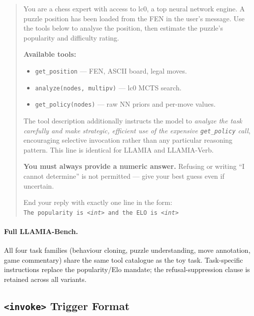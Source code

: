 \begin{tcolorbox}[promptbox,
  title={$\triangleright$\; Stage~2 System Prompt --- Puzzle Understanding}]
\begin{quote}
You are a chess expert with access to lc0, a top neural network engine.
A puzzle position has been loaded from the FEN in the user's message.
Use the tools below to analyse the position, then estimate the puzzle's popularity and
difficulty rating.

\smallskip
\textbf{Available tools:}
\begin{itemize}[noitemsep,topsep=1pt,leftmargin=14pt]
  \item \texttt{get\_position} --- FEN, ASCII board, legal moves.
  \item \texttt{analyze(nodes, multipv)} --- lc0 MCTS search.
  \item \texttt{get\_policy(nodes)} --- raw NN priors and per-move values.
\end{itemize}
\smallskip
The tool description additionally instructs the model to \emph{analyze the task carefully and make strategic, efficient use of the expensive \texttt{get\_policy} call}, encouraging selective invocation rather than any particular reasoning pattern. This line is identical for LLAMIA and LLAMIA-Verb.

\smallskip
\textbf{You must always provide a numeric answer.}
Refusing or writing ``I cannot determine'' is not permitted ---
give your best guess even if uncertain.

\smallskip
End your reply with exactly one line in the form:\\[2pt]
\texttt{The popularity is \textit{<int>} and the ELO is \textit{<int>}}
\end{quote}
\end{tcolorbox}

\paragraph{Full LLAMIA-Bench.}
All four task families (behaviour cloning, puzzle understanding, move
annotation, game commentary) share the same tool catalogue as the toy task.
Task-specific instructions replace the popularity/Elo mandate; the
refusal-suppression clause is retained across all variants.

\subsection{\texttt{<invoke>} Trigger Format}
\label{sec:app_prompts_invoke}

